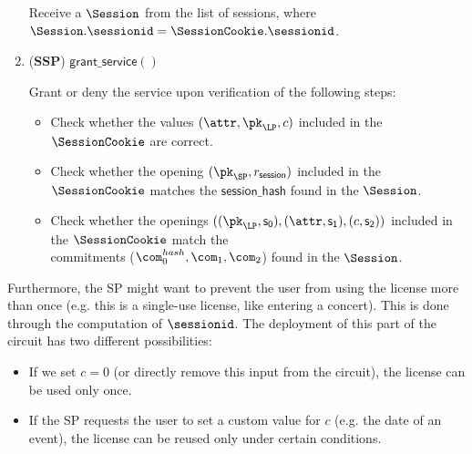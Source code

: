\begin{enumerate}
Receive a $\Session$ from the list of sessions, where $\Session.\sessionid = \SessionCookie.\sessionid$.
	
\item (\textbf{SSP}) $\mathsf{grant\_service()}$

Grant or deny the service upon verification of the following steps:
	
	\begin{itemize}
		\item Check whether the values $(\attr, \pk_{\LP}, c)$ included in the $\SessionCookie$ are correct.
		\item Check whether the opening $(\pk_{\SP}, r_\mathsf{session})$ included in the $\SessionCookie$ matches the $\mathsf{session\_hash}$ found in the $\Session$.
		\item Check whether the openings $((\pk_{\LP}, \mathsf{s_0}), (\attr, \mathsf{s_1}), (c, \mathsf{s_2}))$ included in the $\SessionCookie$ match the\\
			  commitments ($\com_0^{hash}, \com_1, \com_2$) found in the $\Session$.
	\end{itemize}

\end{enumerate}
	

Furthermore, the SP might want to prevent the user from using the license more than once (e.g. this is a single-use license, like entering a concert). This is done through the computation of $\sessionid$. The deployment of this part of the circuit has two different possibilities:
\begin{itemize}
	\item If we set $c = 0$ (or directly remove this input from the circuit), the license can be used only once.
	\item If the SP requests the user to set a custom value for $c$ (e.g. the date of an event), the license can be reused only under certain conditions.
\end{itemize}

